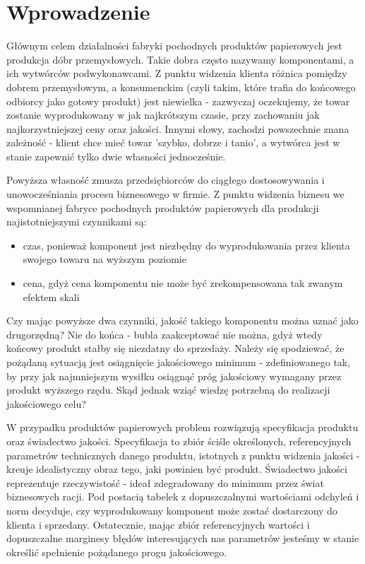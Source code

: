 \documentclass[declaration,shortabstract]{iithesis}
\author         {Adam Kufel}
\begin{document}

\chapter{Wprowadzenie}
Głównym celem działalności fabryki pochodnych produktów papierowych jest produkcja dóbr przemysłowych. Takie dobra często nazywamy komponentami, a ich wytwórców podwykonawcami. Z punktu widzenia klienta różnica pomiędzy dobrem przemysłowym, a konsumenckim (czyli takim, które trafia do końcowego odbiorcy jako gotowy produkt) jest niewielka - zazwyczaj oczekujemy, że towar zostanie wyprodukowany w jak najkrótszym czasie, przy zachowaniu jak najkorzystniejszej ceny oraz jakości. Innymi słowy, zachodzi powszechnie znana zależność - klient chce mieć towar 'szybko, dobrze i tanio', a wytwórca jest w stanie zapewnić tylko dwie własności jednocześnie.
 
Powyższa własność zmusza przedsiębiorców do ciągłego dostosowywania i unowocześniania procesu biznesowego w firmie. 
Z punktu widzenia biznesu we wspomnianej fabryce pochodnych produktów papierowych dla produkcji najistotniejszymi czynnikami są: 
\begin{itemize}
	\item czas, ponieważ komponent jest niezbędny do wyprodukowania przez klienta swojego towaru na wyższym poziomie
	\item cena, gdyż cena komponentu nie może być zrekompensowana tak zwanym efektem skali
\end{itemize}

Czy mając powyższe dwa czynniki, jakość takiego komponentu można uznać jako drugorzędną? Nie do końca - bubla zaakceptować nie można, gdyż wtedy końcowy produkt stałby się niezdatny do sprzedaży. Należy się spodziewać, że pożądaną sytuacją jest osiągnięcie jakościowego minimum - zdefiniowanego tak, by przy jak najmniejszym wysiłku osiągnąć próg jakościowy wymagany przez produkt wyższego rzędu. Skąd jednak wziąć wiedzę potrzebną do realizacji jakościowego celu?

W przypadku produktów papierowych problem rozwiązują specyfikacja produktu oraz świadectwo jakości. Specyfikacja to zbiór ściśle określonych, referencyjnych parametrów technicznych danego produktu, istotnych z punktu widzenia jakości - kreuje idealistyczny obraz tego, jaki powinien być produkt. Świadectwo jakości reprezentuje rzeczywistość - ideał zdegradowany do minimum przez świat biznesowych racji. Pod postacią tabelek z dopuszczalnymi wartościami odchyleń i norm decyduje, czy wyprodukowany komponent może zostać dostarczony do klienta i sprzedany. Ostatecznie, mając zbiór referencyjnych wartości i dopuszczalne marginesy błędów interesujących nas parametrów jesteśmy w stanie określić spełnienie pożądanego progu jakościowego.
\end{document}
